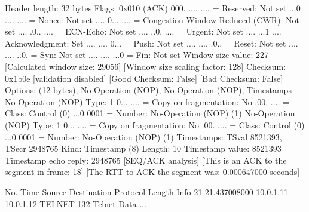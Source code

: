     Header length: 32 bytes
    Flags: 0x010 (ACK)
        000. .... .... = Reserved: Not set
        ...0 .... .... = Nonce: Not set
        .... 0... .... = Congestion Window Reduced (CWR): Not set
        .... .0.. .... = ECN-Echo: Not set
        .... ..0. .... = Urgent: Not set
        .... ...1 .... = Acknowledgment: Set
        .... .... 0... = Push: Not set
        .... .... .0.. = Reset: Not set
        .... .... ..0. = Syn: Not set
        .... .... ...0 = Fin: Not set
    Window size value: 227
    [Calculated window size: 29056]
    [Window size scaling factor: 128]
    Checksum: 0x1b0e [validation disabled]
        [Good Checksum: False]
        [Bad Checksum: False]
    Options: (12 bytes), No-Operation (NOP), No-Operation (NOP), Timestamps
        No-Operation (NOP)
            Type: 1
                0... .... = Copy on fragmentation: No
                .00. .... = Class: Control (0)
                ...0 0001 = Number: No-Operation (NOP) (1)
        No-Operation (NOP)
            Type: 1
                0... .... = Copy on fragmentation: No
                .00. .... = Class: Control (0)
                ...0 0001 = Number: No-Operation (NOP) (1)
        Timestamps: TSval 8521393, TSecr 2948765
            Kind: Timestamp (8)
            Length: 10
            Timestamp value: 8521393
            Timestamp echo reply: 2948765
    [SEQ/ACK analysis]
        [This is an ACK to the segment in frame: 18]
        [The RTT to ACK the segment was: 0.000647000 seconds]

No.     Time           Source                Destination           Protocol Length Info
     21 21.437008000   10.0.1.11             10.0.1.12             TELNET   132    Telnet Data ...

